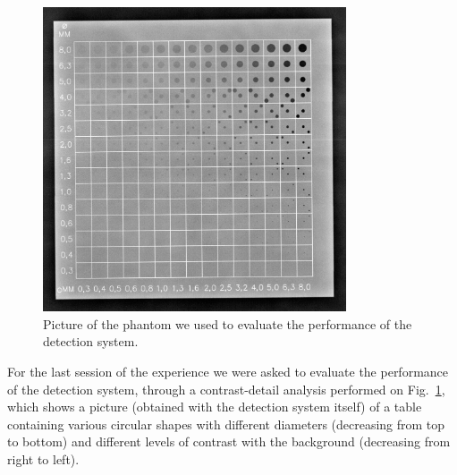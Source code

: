 \documentclass[a4paper]{article}
\begin{document}
\begin{figure}[h]
	\centering
	\includegraphics[width=0.8\textwidth]{./immagini_terza_prova/ex4/CDRAD-10_3.jpg}
  \caption{Picture of the phantom we used to evaluate the performance of the detection system.}
  \label{fig:phantom}
\end{figure}

For the last session of the experience we were asked to evaluate the performance of the detection system, through a contrast-detail analysis  performed on Fig.~\ref{fig:phantom}, which shows a picture (obtained with the detection system itself) of a table containing various circular shapes with different diameters (decreasing from top to bottom) and different levels of contrast with the background (decreasing from right to left).
\end{document}

